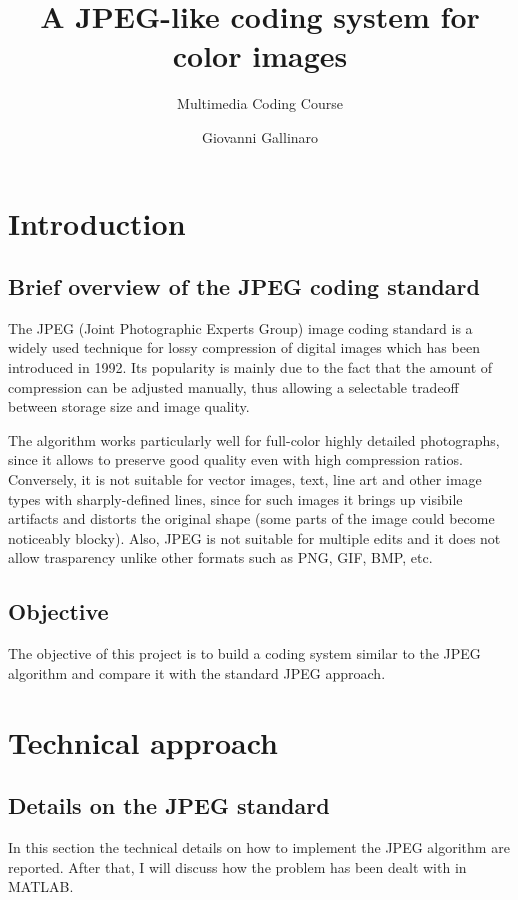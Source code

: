 \documentclass[14pt,a4paper]{extarticle}
\title{A JPEG-like coding system for color images}
\author{Multimedia Coding Course}
\date{Giovanni Gallinaro}
\begin{document}
\maketitle

\section{Introduction}
\subsection{Brief overview of the JPEG coding standard}

The JPEG (Joint Photographic Experts Group) image coding standard is a widely used technique for lossy compression of digital images which has been introduced in 1992. Its popularity is mainly due to the fact that the amount of compression can be adjusted manually, thus allowing a selectable tradeoff between storage size and image quality.

The algorithm works particularly well for full-color highly detailed photographs, since it allows to preserve good quality even with high compression ratios. Conversely, it is not suitable for vector images, text, line art and other image types with sharply-defined lines, since for such images it brings up visibile artifacts and distorts the original shape (some parts of the image could become noticeably blocky). Also, JPEG is not suitable for multiple edits and it does not allow trasparency unlike other formats such as PNG, GIF, BMP, etc.

\subsection{Objective}

The objective of this project is to build a coding system similar to the JPEG algorithm and compare it with the standard JPEG approach.

\section{Technical approach}
\subsection{Details on the JPEG standard}
In this section the technical details on how to implement the JPEG algorithm are reported. After that, I will discuss how the problem has been dealt with in MATLAB.
\end{document}
